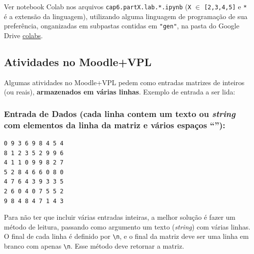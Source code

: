 \documentclass[12pt,a4paper]{article}
\begin{document}
    Ver notebook Colab nos arquivos \texttt{cap6.partX.lab.*.ipynb}
(\texttt{X} \(\in\) \texttt{{[}2,3,4,5{]}} e \texttt{*} é a extensão da
linguagem), utilizando alguma linguagem de programação de sua
preferência, onganizadas em subpastas contidas em \texttt{"gen"}, na
pasta do Google Drive
\href{https://drive.google.com/drive/folders/1YlFwv8XYN7PYYf-HwDMlkxzbmXzJw9cM?usp=sharing}{colabs}.

    \hypertarget{atividades-no-moodlevpl}{%
\subsection{Atividades no Moodle+VPL}\label{atividades-no-moodlevpl}}

Algumas atividades no Moodle+VPL pedem como entradas matrizes de
inteiros (ou reais), \textbf{armazenados em várias linhas}. Exemplo de
entrada a ser lida:

\hypertarget{entrada-de-dados-cada-linha-contem-um-texto-ou-string-com-elementos-da-linha-da-matriz-e-vuxe1rios-espauxe7os}{%
\subsubsection{\texorpdfstring{Entrada de Dados (cada linha contem um
texto ou \emph{string} com elementos da linha da matriz e vários espaços
``\texttt{}''):}{Entrada de Dados (cada linha contem um texto ou string com elementos da linha da matriz e vários espaços ``''):}}\label{entrada-de-dados-cada-linha-contem-um-texto-ou-string-com-elementos-da-linha-da-matriz-e-vuxe1rios-espauxe7os}}

\begin{verbatim}
0 9 3 6 9 8 4 5 4
8 1 2 3 5 2 9 9 6
4 1 1 0 9 9 8 2 7
5 2 8 4 6 6 0 8 0
4 7 6 4 3 9 3 3 5
2 6 0 4 0 7 5 5 2
9 8 4 8 4 7 1 4 3
\end{verbatim}

Para não ter que incluir várias entradas inteiras, a melhor solução é
fazer um método de leitura, passando como argumento um texto
(\emph{string}) com várias linhas. O final de cada linha é definido por
\texttt{\textbackslash{}n}, e o final da matriz deve ser uma linha em
branco com apenas \texttt{\textbackslash{}n}. Esse método deve retornar
a matriz.
\end{document}

